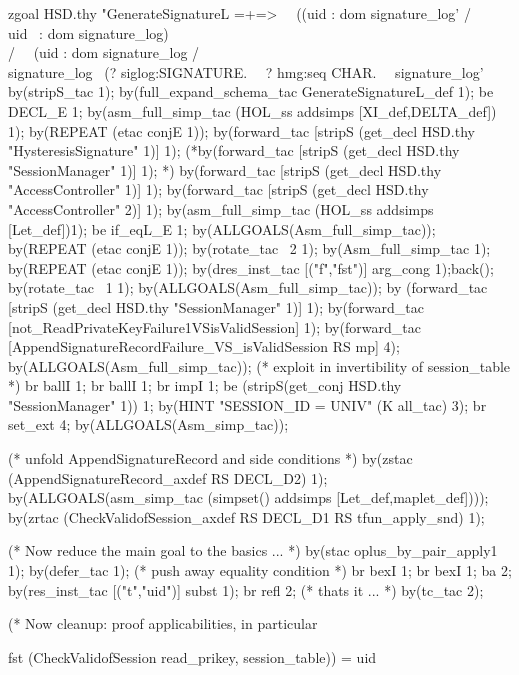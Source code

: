 \documentclass[a4paper,pdftex]{article}
\newenvironment{holz-proof}{\comment}{\endcomment}
\begin{document}
\begin{holz-proof}
zgoal HSD.thy
"GenerateSignatureL =+=>                                                        \
\ ((uid : dom signature_log' /\\ uid ~: dom signature_log) \\/                  \
\  (uid : dom signature_log  /\\ signature_log %
\     (? siglog:SIGNATURE.                                                                \
\        ? hmg:seq CHAR.                                                        \
\            signature_log' %
by(stripS_tac 1);
by(full_expand_schema_tac GenerateSignatureL_def 1);
be DECL_E 1;
by(asm_full_simp_tac (HOL_ss addsimps [XI_def,DELTA_def]) 1); 
by(REPEAT (etac conjE 1));
by(forward_tac [stripS (get_decl HSD.thy "HysteresisSignature" 1)] 1);
(*by(forward_tac [stripS (get_decl HSD.thy "SessionManager" 1)] 1); *)
by(forward_tac [stripS (get_decl HSD.thy "AccessController" 1)] 1);
by(forward_tac [stripS (get_decl HSD.thy "AccessController" 2)] 1);
by(asm_full_simp_tac (HOL_ss addsimps [Let_def])1);
be if_eqL_E 1;
by(ALLGOALS(Asm_full_simp_tac));
by(REPEAT (etac conjE 1));
by(rotate_tac ~2 1);
by(Asm_full_simp_tac 1);
by(REPEAT (etac conjE 1));
by(dres_inst_tac [("f","fst")] arg_cong 1);back();
by(rotate_tac ~1 1);
by(ALLGOALS(Asm_full_simp_tac));
by (forward_tac [stripS (get_decl HSD.thy "SessionManager" 1)] 1);
by(forward_tac [not_ReadPrivateKeyFailure1VSisValidSession] 1);
by(forward_tac [AppendSignatureRecordFailure_VS_isValidSession RS mp] 4);
by(ALLGOALS(Asm_full_simp_tac));
(* exploit in invertibility of session_table *)
br ballI 1;
br ballI 1; br impI 1;
be (stripS(get_conj HSD.thy "SessionManager" 1)) 1;
by(HINT "SESSION_ID = UNIV" (K all_tac) 3);
br set_ext 4;
by(ALLGOALS(Asm_simp_tac));

(* unfold AppendSignatureRecord and side conditions *)
by(zstac (AppendSignatureRecord_axdef RS DECL_D2) 1);
by(ALLGOALS(asm_simp_tac (simpset() addsimps [Let_def,maplet_def])));
by(zrtac (CheckValidofSession_axdef RS DECL_D1 RS tfun_apply_snd) 1);

(* Now reduce the main goal to the basics ... *)
by(stac oplus_by_pair_apply1 1);
by(defer_tac 1); (* push away equality condition *)
br bexI 1; br bexI 1; ba 2;
by(res_inst_tac [("t","uid")] subst 1);
br refl 2; (* thats it ... *)
by(tc_tac 2);


(* Now cleanup: proof applicabilities,
   in particular 

  fst (CheckValidofSession %
                               read_prikey, session_table)) = uid


\end{holz-proof}
\end{document}
